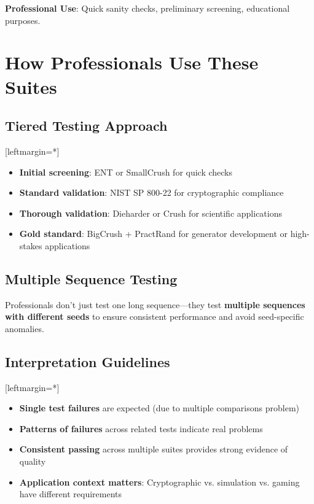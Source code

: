 \documentclass[12pt]{article}
\begin{document}
\textbf{Professional Use}: Quick sanity checks, preliminary screening, educational purposes.

\section*{How Professionals Use These Suites}

\subsection*{Tiered Testing Approach}
[leftmargin=*]\begin{itemize}
    \item \textbf{Initial screening}: ENT or SmallCrush for quick checks
    \item \textbf{Standard validation}: NIST SP 800-22 for cryptographic compliance
    \item \textbf{Thorough validation}: Dieharder or Crush for scientific applications  
    \item \textbf{Gold standard}: BigCrush + PractRand for generator development or high-stakes applications
\end{itemize}

\subsection*{Multiple Sequence Testing}
Professionals don't just test one long sequence---they test \textbf{multiple sequences with different seeds} to ensure consistent performance and avoid seed-specific anomalies.

\subsection*{Interpretation Guidelines}
[leftmargin=*]
\begin{itemize}
    \item \textbf{Single test failures} are expected (due to multiple comparisons problem)
    \item \textbf{Patterns of failures} across related tests indicate real problems
    \item \textbf{Consistent passing} across multiple suites provides strong evidence of quality
    \item \textbf{Application context matters}: Cryptographic vs. simulation vs. gaming have different requirements
\end{itemize}
\end{document}
